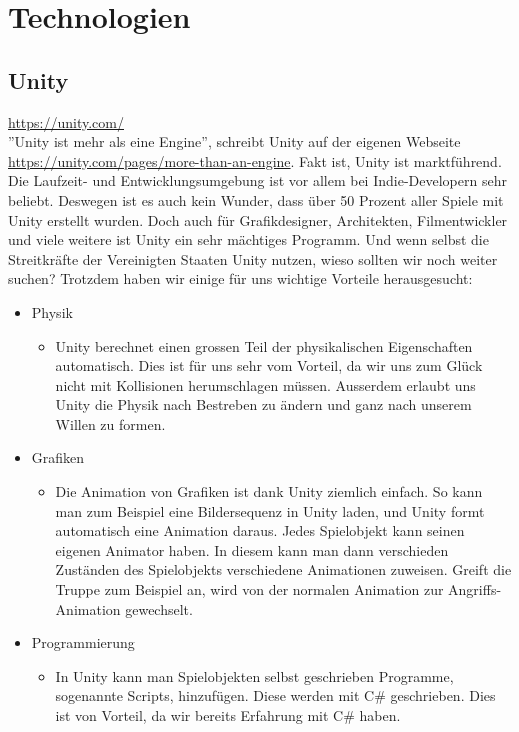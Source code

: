\chapter{Technologien}

\section{Unity}
\url{https://unity.com/}\\
''Unity ist mehr als eine Engine'', schreibt Unity auf der eigenen Webseite \url{https://unity.com/pages/more-than-an-engine}. Fakt ist, Unity ist marktführend. Die Laufzeit- und Entwicklungsumgebung 
ist vor allem bei Indie-Developern sehr beliebt. Deswegen ist es auch kein Wunder, dass über 50 Prozent aller Spiele mit Unity erstellt wurden. 
Doch auch für Grafikdesigner, Architekten, Filmentwickler und viele weitere ist Unity ein sehr mächtiges Programm. Und wenn selbst die Streitkräfte der Vereinigten Staaten Unity nutzen, wieso sollten wir 
noch weiter suchen? Trotzdem haben wir einige für uns wichtige Vorteile herausgesucht:\\

\begin{itemize}
    \item Physik
    \begin{itemize}
        \item Unity berechnet einen grossen Teil der physikalischen Eigenschaften automatisch. Dies ist für uns sehr vom Vorteil, da wir uns zum Glück nicht mit Kollisionen herumschlagen müssen.
        Ausserdem erlaubt uns Unity die Physik nach Bestreben zu ändern und ganz nach unserem Willen zu formen.
    \end{itemize}
    \item Grafiken
    \begin{itemize}
        \item Die Animation von Grafiken ist dank Unity ziemlich einfach. So kann man zum Beispiel eine Bildersequenz in Unity laden, und Unity formt automatisch eine Animation daraus. Jedes Spielobjekt kann seinen
        eigenen Animator haben. In diesem kann man dann verschieden Zuständen des Spielobjekts verschiedene Animationen zuweisen. Greift die Truppe zum Beispiel an, wird von der normalen Animation zur Angriffs-Animation
        gewechselt.  
    \end{itemize}
    \item Programmierung
    \begin{itemize}
        \item In Unity kann man Spielobjekten selbst geschrieben Programme, sogenannte Scripts, hinzufügen. Diese werden mit C\# geschrieben. Dies ist von Vorteil, da wir bereits Erfahrung mit C\# haben. 
    \end{itemize}
\end{itemize}

